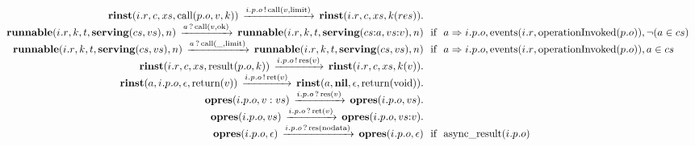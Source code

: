 \[\begin{array}{r@{}c@{}llllll}
\\\Pfact{\Tstep{\Trinst{\Tr{\Tvar{R}}{\Tvar{I}}}{\Tvar{C}}{\Tvar{Xs}}{\TrteCall{\To{\Tvar{O}}{\Tvar{P}}}{\Tvar{V}}{\Tvar{K}}}}{\Tsay{\Top{\Tvar{O}}{\Tvar{P}}{\Tvar{I}}}{\Tcall{\Tvar{V}}{\Tlimit}}}{\Trinst{\Tr{\Tvar{R}}{\Tvar{I}}}{\Tvar{C}}{\Tvar{Xs}}{\Tap{\Tvar{K}}{\Tvar{Res}}}}}
\\\Prule{\Tstep{\Trunnable{\Tr{\Tvar{R}}{\Tvar{I}}}{\Tvar{K}}{\Tvar{T}}{\Tserving{\Tvar{Cs}}{\Tvar{Vs}}}{\Tvar{N}}}{\Thear{\Tvar{A}}{\Tcall{\Tvar{V}}{\Tok}}}{\Trunnable{\Tr{\Tvar{R}}{\Tvar{I}}}{\Tvar{K}}{\Tvar{T}}{\Tserving{\Tseq{\Tvar{Cs}}{\Tvar{A}}}{\Tseq{\Tvar{Vs}}{\Tvar{V}}}}{\Tvar{N}}}}{\Tconnect{\Tvar{A}}{\Top{\Tvar{O}}{\Tvar{P}}{\Tvar{I}}},\Tevents{\Tr{\Tvar{R}}{\Tvar{I}}}{\ToperationInvoked{\To{\Tvar{O}}{\Tvar{P}}}},\Pnegate{\Tmember{\Tvar{A}}{\Tvar{Cs}}}}
\\\Prule{\Tstep{\Trunnable{\Tr{\Tvar{R}}{\Tvar{I}}}{\Tvar{K}}{\Tvar{T}}{\Tserving{\Tvar{Cs}}{\Tvar{Vs}}}{\Tvar{N}}}{\Thear{\Tvar{A}}{\Tcall{\_}{\Tlimit}}}{\Trunnable{\Tr{\Tvar{R}}{\Tvar{I}}}{\Tvar{K}}{\Tvar{T}}{\Tserving{\Tvar{Cs}}{\Tvar{Vs}}}{\Tvar{N}}}}{\Tconnect{\Tvar{A}}{\Top{\Tvar{O}}{\Tvar{P}}{\Tvar{I}}},\Tevents{\Tr{\Tvar{R}}{\Tvar{I}}}{\ToperationInvoked{\To{\Tvar{O}}{\Tvar{P}}}},\Tmember{\Tvar{A}}{\Tvar{Cs}}}
\\\Pfact{\Tstep{\Trinst{\Tr{\Tvar{R}}{\Tvar{I}}}{\Tvar{C}}{\Tvar{Xs}}{\TrteResult{\To{\Tvar{O}}{\Tvar{P}}}{\Tvar{K}}}}{\Tsay{\Top{\Tvar{O}}{\Tvar{P}}{\Tvar{I}}}{\Tres{\Tvar{V}}}}{\Trinst{\Tr{\Tvar{R}}{\Tvar{I}}}{\Tvar{C}}{\Tvar{Xs}}{\Tap{\Tvar{K}}{\Tvar{V}}}}}
\\\Pfact{\Tstep{\Trinst{\Tvar{A}}{\Top{\Tvar{O}}{\Tvar{P}}{\Tvar{I}}}{\Teps}{\Treturn{\Tvar{V}}}}{\Tsay{\Top{\Tvar{O}}{\Tvar{P}}{\Tvar{I}}}{\Tret{\Tvar{V}}}}{\Trinst{\Tvar{A}}{\Tnil}{\Teps}{\Treturn{\Tvoid}}}}
\\\Pfact{\Tstep{\Topres{\Top{\Tvar{O}}{\Tvar{P}}{\Tvar{I}}}{\Tcons{\Tvar{V}}{\Tvar{Vs}}}}{\Thear{\Top{\Tvar{O}}{\Tvar{P}}{\Tvar{I}}}{\Tres{\Tvar{V}}}}{\Topres{\Top{\Tvar{O}}{\Tvar{P}}{\Tvar{I}}}{\Tvar{Vs}}}}
\\\Pfact{\Tstep{\Topres{\Top{\Tvar{O}}{\Tvar{P}}{\Tvar{I}}}{\Tvar{Vs}}}{\Thear{\Top{\Tvar{O}}{\Tvar{P}}{\Tvar{I}}}{\Tret{\Tvar{V}}}}{\Topres{\Top{\Tvar{O}}{\Tvar{P}}{\Tvar{I}}}{\Tseq{\Tvar{Vs}}{\Tvar{V}}}}}
\\\Prule{\Tstep{\Topres{\Top{\Tvar{O}}{\Tvar{P}}{\Tvar{I}}}{\Teps}}{\Thear{\Top{\Tvar{O}}{\Tvar{P}}{\Tvar{I}}}{\Tres{\Tnodata}}}{\Topres{\Top{\Tvar{O}}{\Tvar{P}}{\Tvar{I}}}{\Teps}}}{\Tasyncresult{\Top{\Tvar{O}}{\Tvar{P}}{\Tvar{I}}}}

\end{array}\]
